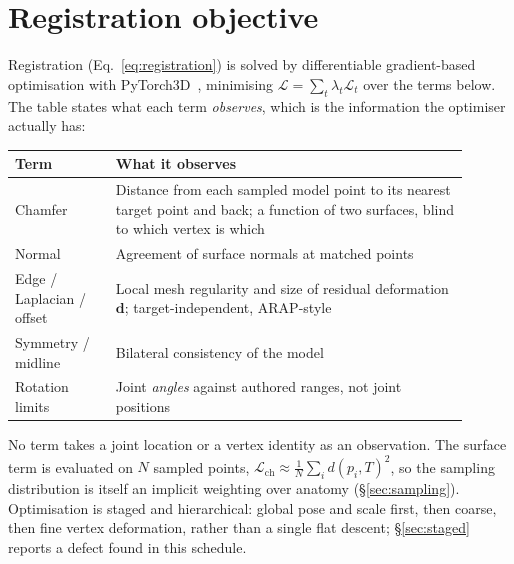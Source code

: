 \section{Registration objective}
\label{sec:registration}

Registration (Eq.~\ref{eq:registration}) is solved by differentiable
gradient-based optimisation with PyTorch3D~\cite{pytorch3d}, minimising
$\mathcal{L}=\sum_t\lambda_t\mathcal{L}_t$ over the terms below. The table
states what each term \emph{observes}, which is the information the
optimiser actually has:
\begin{center}
\small
\begin{tabular}{@{}p{0.20\linewidth}p{0.70\linewidth}@{}}
\toprule
\textbf{Term} & \textbf{What it observes} \\
\midrule
Chamfer & Distance from each sampled model point to its nearest target point
  and back; a function of two surfaces, blind to which vertex is which \\
Normal & Agreement of surface normals at matched points \\
Edge / Laplacian / offset & Local mesh regularity and size of residual
  deformation $\mathbf d$; target-independent, ARAP-style~\cite{arap} \\
Symmetry / midline & Bilateral consistency of the model \\
Rotation limits & Joint \emph{angles} against authored ranges, not joint
  positions \\
\bottomrule
\end{tabular}
\end{center}
No term takes a joint location or a vertex identity as an observation.
The surface term is evaluated on $N$ sampled points,
$\mathcal{L}_{\mathrm{ch}}\approx\frac1N\sum_i d(p_i,T)^2$, so the sampling
distribution is itself an implicit weighting over anatomy
(\S\ref{sec:sampling}). Optimisation is staged and hierarchical: global
pose and scale first, then coarse, then fine vertex deformation, rather
than a single flat descent; \S\ref{sec:staged} reports a defect found in this
schedule.
